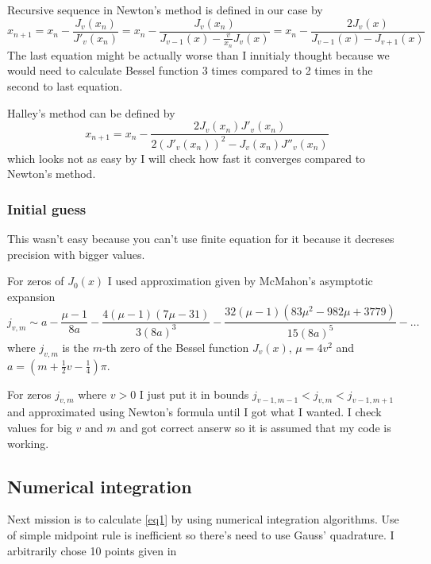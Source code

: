 \documentclass[a4paper]{article}
\begin{document}
	Recursive sequence in Newton's method is defined in our case by
	\begin{equation*}
		x_{n+1} = x_n - \frac{J_v(x_n)}{J'_v(x_n)} = 
			x_n - \frac{J_v(x_n)}{J_{v-1}(x) - \frac{v}{x_n}J_v(x)} =
			x_n - \frac{2J_v(x)}{J_{v-1}(x) - J_{v+1}(x)}
	\end{equation*}
	The last equation might be actually worse than I innitialy thought
	because we would need to calculate Bessel function 3 times compared to 2 times
	in the second to last equation.

	Halley's method can be defined by
	\begin{equation*}
		x_{n+1} = x_n - \frac{2J_v(x_n)J'_v(x_n)}{2(J'_v(x_n))^2 - J_v(x_n)J''_v(x_n)}
	\end{equation*}
	which looks not as easy by I will check how fast it converges compared to
	Newton's method.
	\subsubsection{Initial guess}
	This wasn't easy because you can't use finite equation for 
	it because it decreses precision with bigger values.

	For zeros of $J_0(x)$ I used approximation given by McMahon's
	asymptotic expansion \cite[equation 10.21.19]{NIST:DLMF}	
	\begin{equation}
		j_{v,m} \sim a - \frac{\mu - 1}{8a} - \frac{4(\mu -1)(7\mu-31)}{3(8a)^3}
			- \frac{32(\mu-1)(83\mu^2-982\mu+3779)}{15(8a)^5} - \dots
	\end{equation}
	where $j_{v,m}$ is the $m$-th zero of the Bessel function $J_v(x)$,
	$\mu=4v^2$ and $a=(m+\frac{1}{2}v-\frac{1}{4})\pi$.
	
	For zeros $j_{v,m}$ where $v > 0$ I just put it in bounds $j_{v-1,m-1} < j_{v,m} < j_{v-1,m+1}$
	\cite[equation 10.21.2]{NIST:DLMF} and approximated using Newton's formula until I got what I wanted. I check values for
	big $v$ and $m$ and got correct anserw so it is assumed that my code is working.

	\subsection{Numerical integration}
	Next mission is to calculate \ref{eq1} by using numerical 
	integration algorithms.
	Use of simple midpoint rule is inefficient so there's need to use Gauss'
	quadrature. I arbitrarily chose 10 points given in \cite[table 3.5.2]{NIST:DLMF}
\end{document}
